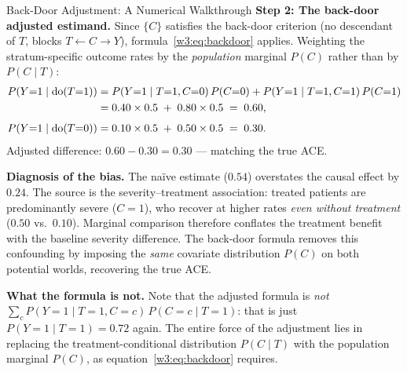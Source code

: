 \documentclass[master.tex]{subfiles}
\begin{document}
\begin{example}{Back-Door Adjustment: A Numerical Walkthrough}
\medskip
\noindent\textbf{Step 2: The back-door adjusted estimand.}
Since $\{C\}$ satisfies the back-door criterion (no descendant of $T$, blocks
$T \leftarrow C \to Y$), formula~\eqref{w3:eq:backdoor} applies.  Weighting
the stratum-specific outcome rates by the \emph{population} marginal
$P(C)$ rather than by $P(C \mid T)$:
\begin{align*}
  P\!\left(Y{=}1 \mid \mathrm{do}(T{=}1)\right)
  &= P(Y{=}1\mid T{=}1,C{=}0)\,P(C{=}0)
    + P(Y{=}1\mid T{=}1,C{=}1)\,P(C{=}1)\\
  &= 0.40\times 0.5 \;+\; 0.80\times 0.5 \;=\; 0.60,\\[4pt]
  P\!\left(Y{=}1 \mid \mathrm{do}(T{=}0)\right)
  &= 0.10\times 0.5 \;+\; 0.50\times 0.5 \;=\; 0.30.
\end{align*}
Adjusted difference: $0.60 - 0.30 = \mathbf{0.30}$ --- matching the true ACE.

\medskip
\noindent\textbf{Diagnosis of the bias.}
The na\"{i}ve estimate ($0.54$) overstates the causal effect by $0.24$.
The source is the severity--treatment association: treated patients are
predominantly severe ($C{=}1$), who recover at higher rates \emph{even
without treatment} ($0.50$ vs.\ $0.10$).  Marginal comparison therefore
conflates the treatment benefit with the baseline severity difference.
The back-door formula removes this confounding by imposing the
\emph{same} covariate distribution $P(C)$ on both potential worlds,
recovering the true ACE.

\medskip
\noindent\textbf{What the formula is not.}
Note that the adjusted formula is \emph{not}
$\sum_c P(Y{=}1\mid T{=}1,C{=}c)\,P(C{=}c \mid T{=}1)$: that is just
$P(Y{=}1 \mid T{=}1) = 0.72$ again.  The entire force of the adjustment
lies in replacing the treatment-conditional distribution $P(C \mid T)$
with the population marginal $P(C)$, as equation~\eqref{w3:eq:backdoor}
requires.
\end{example}
\end{document}
